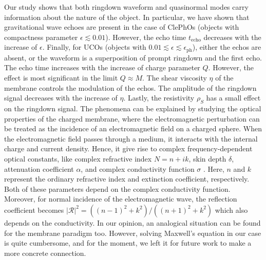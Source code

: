 \documentclass[aps,prd,twocolumn,floatfix,noshowpacs,tightenlines,noshowkeys,superscriptaddress,amsmath,amssymb,
nofootinbib]{revtex4-1}
\renewcommand\[{\begin{equation}}
\renewcommand\]{\end{equation}}
\begin{document}
Our study shows that both ringdown waveform and quasinormal modes carry information about the nature of the object. In particular, we have shown that gravitational wave echoes are present in the case of ClePhOs (objects with compactness parameter $\epsilon\lesssim 0.01$).  However, the echo time $t_{\textrm{echo}}$ decreases with the increase of $\epsilon$. Finally, for UCOs (objects with  $0.01\lesssim\epsilon\lesssim \epsilon_{\textrm{ph}}$), either the echos are absent, or the waveform is a superposition of prompt ringdown and the first echo. The echo time increases with the increase of charge parameter $Q$. However, the effect is most significant in the limit $Q\approx M$. The shear viscosity $\eta$ of the membrane controls the modulation of the echos. The amplitude of the ringdown signal decreases with the increase of $\eta$. Lastly, the resistivity $\rho_{S}$ has a small effect on the ringdown signal. The phenomena can be explained by studying the optical properties of the charged membrane, where the electromagnetic perturbation can be treated as the incidence of an electromagnetic field on a charged sphere. When the electromagnetic field passes through a medium, it interacts with the internal charge and current density. Hence, it give rise to complex frequency-dependent optical constants, like complex refractive index $N=n+i k$, skin depth $\delta$, attenuation coefficient $\alpha$, and complex conductivity function $\sigma$ \cite{Kittel2004}. Here, $n$ and $k$ represent the ordinary refractive index and extinction coefficient, respectively. Both of these parameters depend on the complex conductivity function. Moreover, for normal incidence of the electromagnetic wave, the reflection coefficient becomes $|\mathcal{R}|^2=((n-1)^2+k^2)/((n+1)^2+k^2)$ which also depends on the conductivity. In our opinion, an analogical situation can be found for the membrane paradigm too. However, solving Maxwell's equation in our case is quite cumbersome, and for the moment, we left it for future work to make a more concrete connection.\ \par
\end{document}
